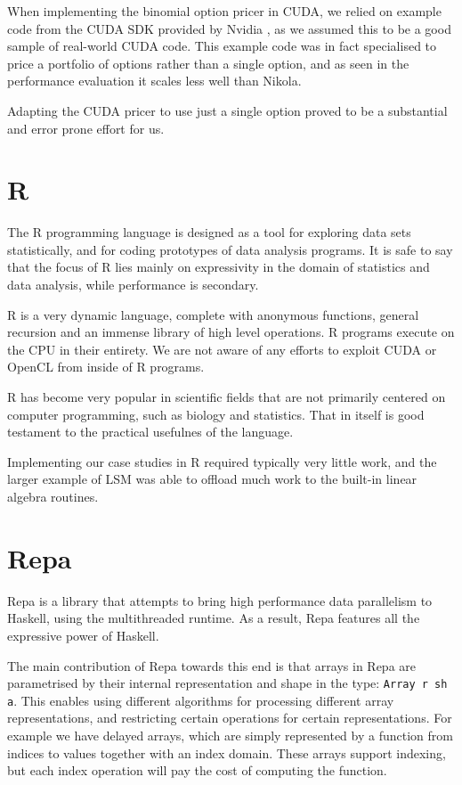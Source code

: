 When implementing the binomial option pricer in CUDA, we relied on example code
from the CUDA SDK provided by Nvidia \cite{CUDAbinomial}, as we assumed this to
be a good sample of real-world CUDA code. This example code was in fact
specialised to price a portfolio of options rather than a single option, and as
seen in the performance evaluation it scales less well than Nikola.

Adapting the CUDA pricer to use just a single option proved to be a substantial
and error prone effort for us.

\section{R}

The R programming language is designed as a tool for exploring data sets
statistically, and for coding prototypes of data analysis programs.  It is safe
to say that the focus of R lies mainly on expressivity in the domain of
statistics and data analysis, while performance is secondary.

R is a very dynamic language, complete with anonymous functions, general
recursion and an immense library of high level operations. R programs execute
on the CPU in their entirety. We are not aware of any efforts to exploit CUDA
or OpenCL from inside of R programs.

R has become very popular in scientific fields that are not primarily centered
on computer programming, such as biology and statistics\cite{}. That in itself
is good testament to the practical usefulnes of the language.

Implementing our case studies in R required typically very little work, and the
larger example of LSM was able to offload much work to the built-in linear
algebra routines.

\section{Repa}

Repa is a library that attempts to bring high performance data parallelism to
Haskell, using the multithreaded runtime. As a result, Repa features all the
expressive power of Haskell.

The main contribution of Repa towards this end is that arrays in Repa are
parametrised by their internal representation and shape in the type:
\texttt{Array r sh a}.  This enables using different algorithms for processing
different array representations, and restricting certain operations for certain
representations. For example we have delayed arrays, which are simply
represented by a function from indices to values together with an index domain.
These arrays support indexing, but each index operation will pay the cost of
computing the function.

